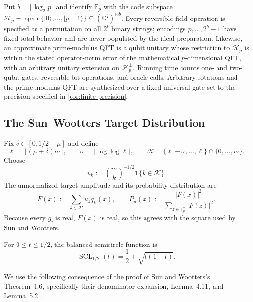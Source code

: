 \documentclass[11pt,letterpaper]{article}
\theoremstyle{definition}
\newcommand{\F}{\mathbb{F}}
\newcommand{\Kcal}{\mathcal{K}}
\newcommand{\SCL}{\operatorname{SCL}}
\newcommand{\ket}[1]{\lvert #1\rangle}
\newcommand{\abs}[1]{\left\lvert #1\right\rvert}
\newcommand{\one}{\mathbf{1}}
\begin{document}
Put $b=\lceil\log_2p\rceil$ and identify $\F_p$ with the code subspace $\mathcal H_p=\operatorname{span}\{\ket0,\ldots,\ket{p-1}\}\subseteq(\mathbb C^2)^{\otimes b}$.  Every reversible field operation is specified as a permutation on all $2^b$ binary strings; encodings $p,\ldots,2^b-1$ have fixed total behavior and are never populated by the ideal preparation.  Likewise, an approximate prime-modulus QFT is a qubit unitary whose restriction to $\mathcal H_p$ is within the stated operator-norm error of the mathematical $p$-dimensional QFT, with an arbitrary unitary extension on $\mathcal H_p^\perp$.  Running time counts one- and two-qubit gates, reversible bit operations, and oracle calls.  Arbitrary rotations and the prime-modulus QFT are synthesized over a fixed universal gate set to the precision specified in \cref{cor:finite-precision}.

\subsection{The Sun--Wootters Target Distribution}

Fix $\delta\in[0,1/2-\mu]$ and define
\begin{equation}
   \ell=\lfloor(\mu+\delta)m\rfloor,
   \qquad
   \sigma=\lfloor\log\log\ell\rfloor,
   \qquad
   \Kcal=\{\ell-\sigma,\ldots,\ell\}\cap\{0,\ldots,m\}.
   \label{eq:shell}
\end{equation}
Choose
\begin{equation}
   u_k:=\binom{m}{k}^{-1/2}\one\{k\in\Kcal\}.
   \label{eq:weights}
\end{equation}
The unnormalized target amplitude and its probability distribution are
\begin{equation}
   F(x):=\sum_{k\in\Kcal}u_kq_k(x),
   \qquad
   P_u(x):=\frac{\abs{F(x)}^2}{\sum_{z\in\F_p^n}\abs{F(z)}^2}.
   \label{eq:Pu}
\end{equation}
Because every $g_i$ is real, $F(x)$ is real, so this agrees with the square used by Sun and Wootters.

For $0\le t\le1/2$, the balanced semicircle function is
\begin{equation}
   \SCL_{1/2}(t)=\frac12+\sqrt{t(1-t)}.
   \label{eq:scl}
\end{equation}

We use the following consequence of the proof of Sun and Wootters's Theorem~1.6, specifically their denominator expansion, Lemma~4.11, and Lemma~5.2 \cite{SunWootters2026}.
\end{document}
